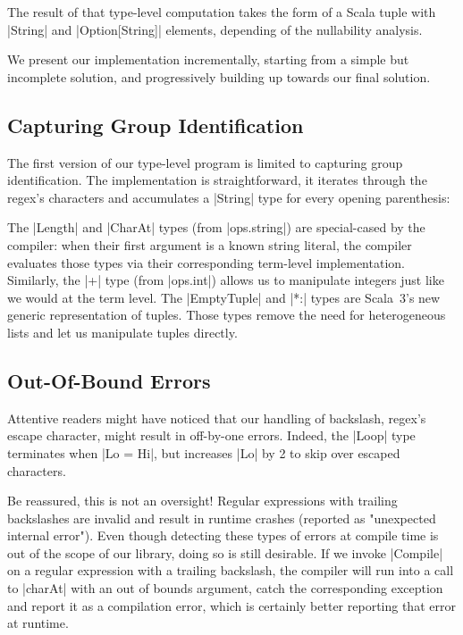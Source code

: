 \noindent
The result of that type-level computation takes the form of a Scala tuple with |String| and |Option[String]| elements, depending of the nullability analysis.

We present our implementation incrementally, starting from a simple but incomplete solution, and progressively building up towards our final solution.

\subsection{Capturing Group Identification}

The first version of our type-level program is limited to capturing group identification.
The implementation is straightforward, it iterates through the regex's characters and accumulates a |String| type for every opening parenthesis:

\regexFirstIteration
%
%

\noindent
The |Length| and |CharAt| types (from |ops.string|) are special-cased by the compiler: when their first argument is a known string literal, the compiler evaluates those types via their corresponding term-level implementation.
Similarly, the |+| type (from |ops.int|) allows us to manipulate integers just like we would at the term level.
The |EmptyTuple| and |*:| types are Scala~3's new generic representation of tuples.
Those types remove the need for heterogeneous lists and let us manipulate tuples directly.

\subsection{Out-Of-Bound Errors}

Attentive readers might have noticed that our handling of backslash, regex's escape character, might result in off-by-one errors.
Indeed, the |Loop| type terminates when |Lo = Hi|, but increases |Lo| by 2 to skip over escaped characters.

Be reassured, this is not an oversight!
Regular expressions with trailing backslashes are invalid and result in runtime crashes (reported as "unexpected internal error").
Even though detecting these types of errors at compile time is out of the scope of our library, doing so is still desirable.
If we invoke |Compile| on a regular expression with a trailing backslash, the compiler will run into a call to |charAt| with an out of bounds argument, catch the corresponding exception and report it as a compilation error, which is certainly better reporting that error at runtime.

